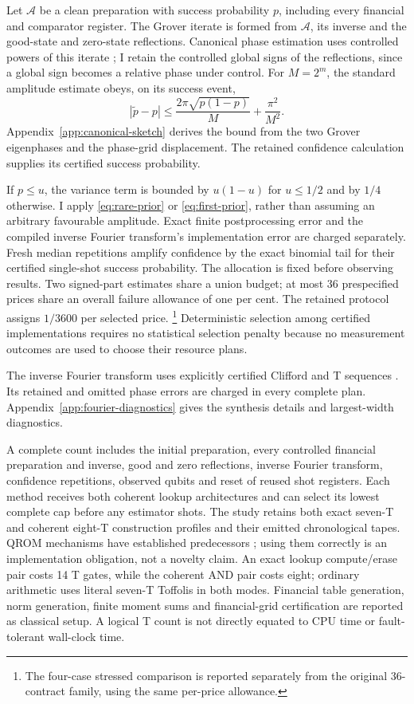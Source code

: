 \documentclass[11pt]{article}
\begin{document}
Let $\mathcal A$ be a clean preparation with success probability $p$,
including every financial and comparator register.  The Grover iterate is
formed from $\mathcal A$, its inverse and the good-state and zero-state
reflections.  Canonical phase estimation uses controlled powers of this
iterate \citep{brassard}; I retain the controlled global signs of the
reflections, since a global sign becomes a relative phase under control.
For $M=2^m$, the standard amplitude estimate obeys, on its success event,
\begin{equation}
 |\widetilde p-p|\leq
 \frac{2\pi\sqrt{p(1-p)}}M+\frac{\pi^2}{M^2}.
 \label{eq:canonical-error}
\end{equation}
Appendix~\ref{app:canonical-sketch} derives the bound from the two Grover eigenphases and the phase-grid displacement. The retained confidence calculation supplies its certified success probability.

If $p\leq u$, the variance term is bounded by $u(1-u)$ for $u\leq1/2$
and by $1/4$ otherwise.  I apply \eqref{eq:rare-prior} or
\eqref{eq:first-prior}, rather than assuming an arbitrary favourable
amplitude.  Exact finite postprocessing error and the compiled inverse
Fourier transform's implementation error are charged separately.
Fresh median repetitions amplify confidence by the exact binomial tail
for their certified single-shot success probability.  The allocation is
fixed before observing results.  Two signed-part estimates share a union
budget; at most 36 prespecified prices share an overall failure allowance of
one per cent.  The retained protocol assigns $1/3600$ per selected price.
\footnote{The four-case stressed comparison is reported separately from
the original 36-contract family, using the same per-price allowance.}
Deterministic selection among certified implementations requires no
statistical selection penalty because no measurement outcomes are used to
choose their resource plans.

The inverse Fourier transform uses explicitly certified Clifford and T sequences \citep{rossselinger2016}. Its retained and omitted phase errors are charged in every complete plan. Appendix~\ref{app:fourier-diagnostics} gives the synthesis details and largest-width diagnostics.

A complete count includes the initial preparation, every controlled
financial preparation and inverse, good and zero reflections, inverse
Fourier transform, confidence repetitions, observed qubits and reset of
reused shot registers.  Each method receives both coherent lookup architectures and can select
its lowest complete cap before any estimator shots.  The study retains both exact seven-T and
coherent eight-T construction profiles and their emitted chronological
tapes.  QROM mechanisms have established predecessors \citep{babbush};
using them correctly is an implementation obligation, not a novelty claim.
An exact lookup compute/erase pair costs 14 T gates, while the coherent
AND pair costs eight; ordinary arithmetic uses literal seven-T Toffolis
in both modes. Financial table generation, norm generation, finite moment sums and
financial-grid certification are reported as classical setup.
A logical T count is not directly equated to CPU time or fault-tolerant
wall-clock time.
\end{document}
